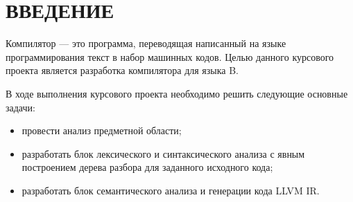 \maketableofcontents

\chapter*{\textbf{ВВЕДЕНИЕ}}

Компилятор — это программа, переводящая написанный на языке программирования текст в набор машинных кодов.
Целью данного курсового проекта является разработка компилятора для языка B.

В ходе выполнения курсового проекта необходимо решить следующие основные задачи:
\begin{itemize}
	\item провести анализ предметной области;
	\item разработать блок лексического и синтаксического анализа с явным построением дерева разбора для заданного исходного кода;
	\item разработать блок семантического анализа и генерации кода LLVM IR.
\end{itemize}